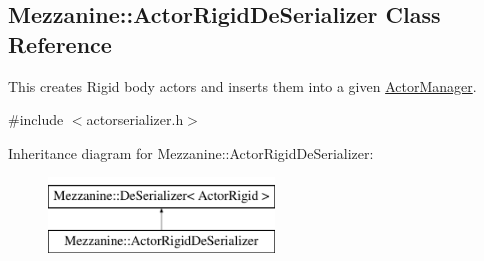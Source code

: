 \hypertarget{classMezzanine_1_1ActorRigidDeSerializer}{
\subsection{Mezzanine::ActorRigidDeSerializer Class Reference}
\label{classMezzanine_1_1ActorRigidDeSerializer}
}


This creates Rigid body actors and inserts them into a given \hyperlink{classMezzanine_1_1ActorManager}{ActorManager}.  




{\ttfamily \#include $<$actorserializer.h$>$}

Inheritance diagram for Mezzanine::ActorRigidDeSerializer:\begin{figure}[H]
\begin{center}
\leavevmode
\includegraphics[height=2.000000cm]{classMezzanine_1_1ActorRigidDeSerializer}
\end{center}
\end{figure}
